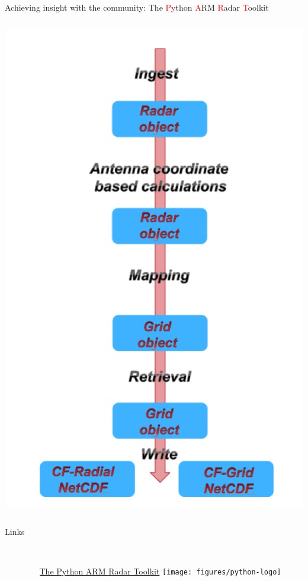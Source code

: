 \documentclass[final]{beamer}
\begin{document}
\begin{frame}{}
\begin{columns}[t]
\begin{column}{.3\linewidth}
\begin{block}{Achieving insight with the community: The \textcolor{red}{Py}thon \textcolor{red}{A}RM \textcolor{red}{R}adar \textcolor{red}{T}oolkit}
\begin{columns}[t]
\begin{column}{.4\linewidth}
                       \includegraphics[width=0.9\linewidth]{figures/pyart-flow}\\[1ex]   
                   \end{column}
               \end{columns}
                       \end{block}
        
         \begin{block}{Links}
         	\begin{columns}[c]
	\begin{column}{.02\linewidth}
	\end{column}
         		\begin{column}{.28\linewidth}
		   		\\
         			
         			{\small \hyperlink{http://arm-doe.github.io/pyart/}{The Python ARM Radar Toolkit}} 
			        \texttt{[image: figures/python-logo]}\\[1ex]   


\end{column}
\end{columns}
\end{block}
\end{column}
\end{columns}
\end{frame}
\end{document}
